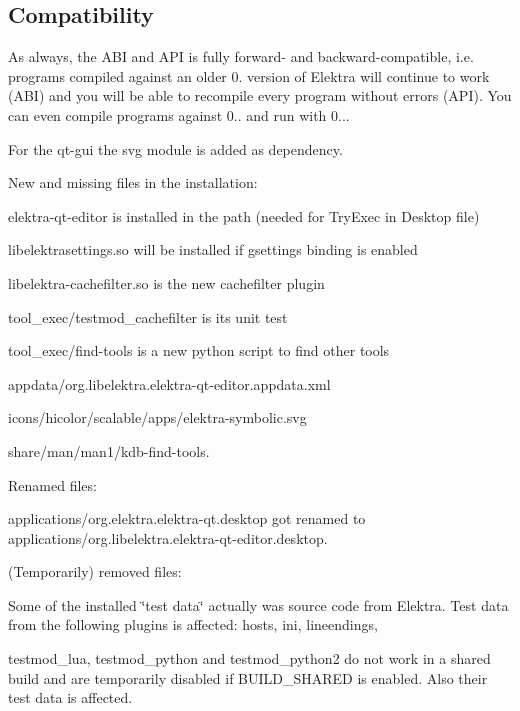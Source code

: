 \subsection*{Compatibility}

As always, the A\+B\+I and A\+P\+I is fully forward-\/ and backward-\/compatible, i.\+e. programs compiled against an older 0. version of Elektra will continue to work (A\+B\+I) and you will be able to recompile every program without errors (A\+P\+I). You can even compile programs against 0.. and run with 0...

For the qt-\/gui the svg module is added as dependency.

New and missing files in the installation\+:


\begin{DoxyItemize}
\item {\ttfamily elektra-\/qt-\/editor} is installed in the path (needed for Try\+Exec in Desktop file)
\item {\ttfamily libelektrasettings.\+so} will be installed if {\ttfamily gsettings} binding is enabled
\item {\ttfamily libelektra-\/cachefilter.\+so} is the new cachefilter plugin
\item {\ttfamily tool\+\_\+exec/testmod\+\_\+cachefilter} is its unit test
\item {\ttfamily tool\+\_\+exec/find-\/tools} is a new python script to find other tools
\item {\ttfamily appdata/org.\+libelektra.\+elektra-\/qt-\/editor.\+appdata.\+xml}
\item {\ttfamily icons/hicolor/scalable/apps/elektra-\/symbolic.\+svg}
\item {\ttfamily share/man/man1/kdb-\/find-\/tools.}
\end{DoxyItemize}

Renamed files\+:


\begin{DoxyItemize}
\item {\ttfamily applications/org.\+elektra.\+elektra-\/qt.\+desktop} got renamed to {\ttfamily applications/org.\+libelektra.\+elektra-\/qt-\/editor.\+desktop}.
\end{DoxyItemize}

(Temporarily) removed files\+:


\begin{DoxyItemize}
\item Some of the installed \char`\"{}test data\char`\"{} actually was source code from Elektra. Test data from the following plugins is affected\+: {\ttfamily hosts}, {\ttfamily ini}, {\ttfamily lineendings},
\item {\ttfamily testmod\+\_\+lua}, {\ttfamily testmod\+\_\+python} and {\ttfamily testmod\+\_\+python2} do not work in a shared build and are temporarily disabled if {\ttfamily B\+U\+I\+L\+D\+\_\+\+S\+H\+A\+R\+E\+D} is enabled. Also their test data is affected.
\end{DoxyItemize}


